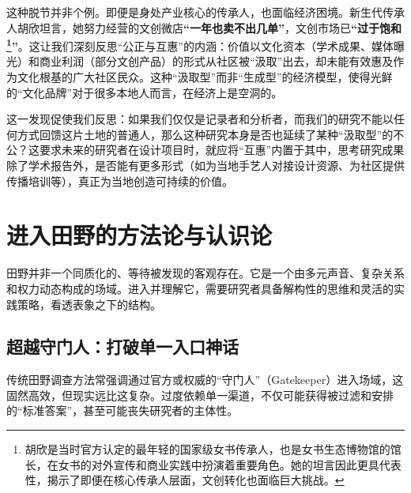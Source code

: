 \documentclass[UTF8]{ctexart}
\begin{document}
这种脱节并非个例。即便是身处产业核心的传承人，也面临经济困境。新生代传承人胡欣坦言，她努力经营的文创微店\textbf{“一年也卖不出几单”}，文创市场已\textbf{“过于饱和\footnote[1]{胡欣是当时官方认定的最年轻的国家级女书传承人，也是女书生态博物馆的馆长，在女书的对外宣传和商业实践中扮演着重要角色。她的坦言因此更具代表性，揭示了即便在核心传承人层面，文创转化也面临巨大挑战。}”}。这让我们深刻反思“公正与互惠”的内涵：价值以文化资本（学术成果、媒体曝光）和商业利润（部分文创产品）的形式从社区被“汲取”出去，却未能有效惠及作为文化根基的广大社区民众。这种“汲取型”而非“生成型”的经济模型，使得光鲜的“文化品牌”对于很多本地人而言，在经济上是空洞的。

这一发现促使我们反思：如果我们仅仅是记录者和分析者，而我们的研究不能以任何方式回馈这片土地的普通人，那么这种研究本身是否也延续了某种“汲取型”的不公？这要求未来的研究者在设计项目时，就应将“互惠”内置于其中，思考研究成果除了学术报告外，是否能有更多形式（如为当地手艺人对接设计资源、为社区提供传播培训等），真正为当地创造可持续的价值。

\newpage

\section{进入田野的方法论与认识论}

田野并非一个同质化的、等待被发现的客观存在。它是一个由多元声音、复杂关系和权力动态构成的场域。进入并理解它，需要研究者具备解构性的思维和灵活的实践策略，看透表象之下的结构。

\subsection{超越守门人：打破单一入口神话}
传统田野调查方法常强调通过官方或权威的“守门人”（Gatekeeper）进入场域，这固然高效，但现实远比这复杂。过度依赖单一渠道，不仅可能获得被过滤和安排的“标准答案”，甚至可能丧失研究者的主体性。
\end{document}
